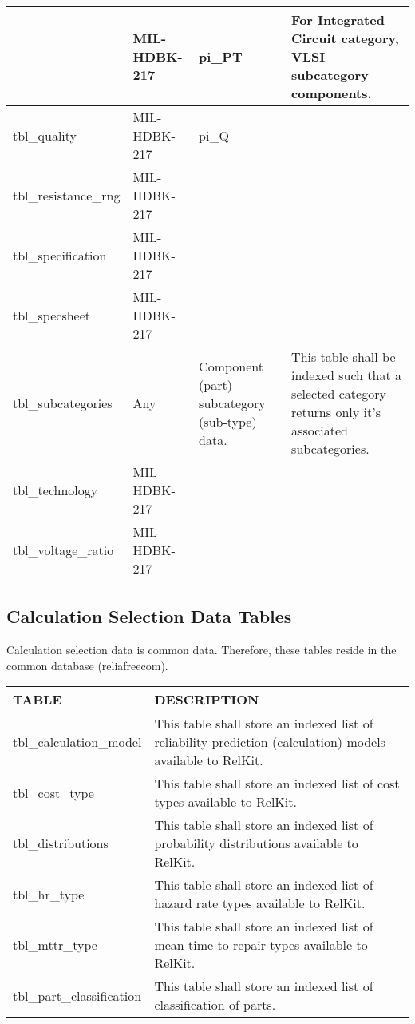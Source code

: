 \documentclass[11pt, 12pt, twoside, onecolumn]{article}
\begin{document}
\begin{landscape}
\begin{tabular}{p{2.0in} | m{1.5in} | m{1.5in} | p{3.75in}}
    & MIL-HDBK-217 & pi\_PT & For Integrated Circuit category, VLSI subcategory components. \\ \hline
    tbl\_quality & MIL-HDBK-217 & pi\_Q & \\ \hline
    tbl\_resistance\_rng & MIL-HDBK-217 & & \\ \hline
    tbl\_specification & MIL-HDBK-217 & & \\ \hline
    tbl\_specsheet & MIL-HDBK-217 & & \\ \hline
    tbl\_subcategories & Any & Component (part) subcategory (sub-type) data. & This table shall be indexed such that a selected category returns only it's associated subcategories. \\ \hline
    tbl\_technology & MIL-HDBK-217 & & \\ \hline
    tbl\_voltage\_ratio & MIL-HDBK-217 & & \\ \hline
    \hline
    \end{tabular}
    \end{landscape}

\subsection{\bf \large Calculation Selection Data Tables}

\noindent Calculation selection data is common data.  Therefore, these tables reside in the common database (reliafreecom). \\

    \begin{landscape}
    \begin{longtable}{ll}
    TABLE & DESCRIPTION \\
    \hline
    tbl\_calculation\_model & This table shall store an indexed list of reliability prediction (calculation) models available to RelKit. \\
    tbl\_cost\_type & This table shall store an indexed list of cost types available to RelKit. \\
    tbl\_distributions & This table shall store an indexed list of probability distributions available to RelKit. \\
    tbl\_hr\_type & This table shall store an indexed list of hazard rate types available to RelKit. \\
    tbl\_mttr\_type & This table shall store an indexed list of mean time to repair types available to RelKit. \\
    tbl\_part\_classification & This table shall store an indexed list of classification of parts. \\
    \hline
    \end{longtable}
    \end{landscape}
\end{document}

